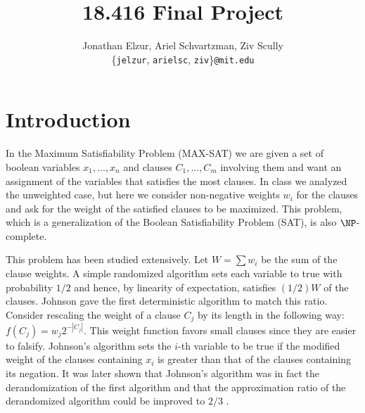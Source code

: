 \documentclass[11pt,letter]{article}
\begin{document}


\title{18.416 Final Project}

\author{Jonathan Elzur, Ariel Schvartzman, Ziv Scully \\
  \{\texttt{jelzur}, \texttt{arielsc}, \texttt{ziv}\}\texttt{@mit.edu}}

\maketitle


\section{Introduction}

In the Maximum Satisfiability Problem (MAX-SAT) we are given a set of boolean variables $x_1, ..., x_n$
and clauses $C_1,...,C_m$ involving them and want an assignment of the variables that satisfies the most clauses.
In class we analyzed the unweighted case, but here we consider non-negative weights $w_i$ for the clauses
and ask for the weight of the satisfied clauses to be maximized. This problem, which is a generalization of the
Boolean Satisfiability Problem (SAT), is also $\NP$-complete.

This problem has been studied extensively. Let $W = \sum w_i$ be the sum of the clause weights.
A simple randomized algorithm sets each variable to true with probability $1/2$ and hence,
by linearity of expectation, satisfies $(1/2)W$ of the clauses. Johnson \cite{Johnson1974256}
gave the first deterministic algorithm to match this ratio. Consider rescaling the weight of a clause $C_j$
by its length in the following way: $f(C_j) = w_j 2^{-|C_j|}$. This weight function favors small clauses
since they are easier to falsify. Johnson's algorithm sets the $i$-th variable to be true
if the modified weight of the clauses containing $x_i$ is greater than that of the clauses containing its negation.
It was later shown that Johnson's algorithm was in fact the derandomization of the first algorithm and that the
approximation ratio of the derandomized algorithm could be improved to $2/3$ \cite{Chen1999622}.
\end{document}
